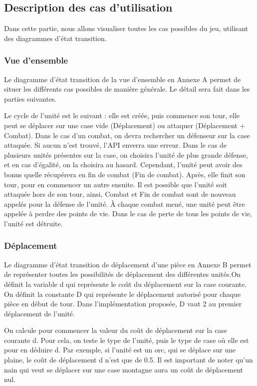 \subsection{Description des cas d'utilisation}
Dans cette partie, nous allons visualiser toutes les cas possibles du jeu, utilisant des diagrammes d'état transition.
\subsubsection{Vue d'ensemble}
Le diagramme d'état transition de la vue d'ensemble en Annexe A permet de situer les différents cas possibles de manière générale.  Le détail sera fait dans les parties suivantes.

Le cycle de l'unité est le suivant : elle est créée, puis commence son tour, elle peut se déplacer sur une case vide (Déplacement) ou attaquer (Déplacement + Combat). Dans le cas d'un combat, on devra rechercher un défenseur sur la case attaquée. Si aucun n'est trouvé, l'API enverra une erreur. Dans le cas de plusieurs unités présentes sur la case, on choisira l'unité de plus grande défense, et en cas d'égalité, on la choisira au hasard. Cependant, l'unité peut avoir des bonus quelle récupérera en fin de combat (Fin de combat). Après, elle finit son tour, pour en commencer un autre ensuite. Il est possible que l'unité soit attaquée hors de son tour, ainsi, Combat et Fin de combat sont de nouveau appelés pour la défense de l'unité. À chaque combat mené, une unité peut être appelée à perdre des points de vie. Dans le cas de perte de tous les points de vie, l'unité est détruite.

\subsubsection{Déplacement}
Le diagramme d'état transition de déplacement d'une pièce en Annexe B permet de représenter toutes les possibilités de déplacement des différentes unités.\smallbreak On définit la variable d qui représente le coût du déplacement sur la case courante. \smallbreak On définit la constante D qui représente le déplacement autorisé pour chaque pièce en début de tour. Dans l'implémentation proposée, D vaut 2 au premier déplacement de l'unité.

On calcule pour commencer la valeur du coût de déplacement sur la case courante d. Pour cela, on teste le type de l'unité, puis le type de case où elle est pour en déduire d. Par exemple, si l'unité est un orc, qui se déplace sur une plaine, le coût de déplacement d n'est que de 0.5. Il est important de noter qu'un nain qui veut se déplacer sur une case montagne aura un coût de déplacement nul.

